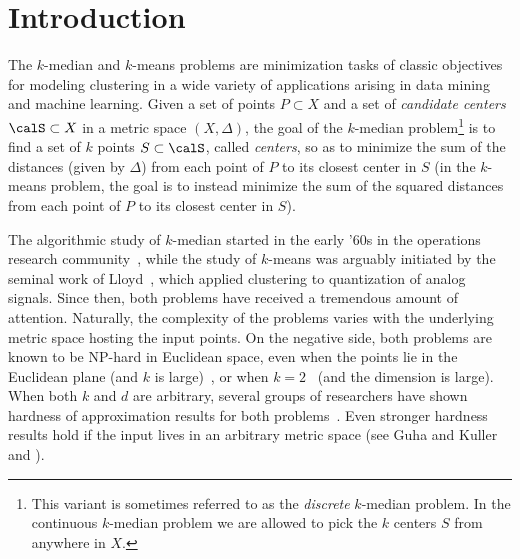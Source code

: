 \section{Introduction}
The $k$-median and $k$-means problems are minimization tasks of classic objectives for modeling
clustering in a wide variety of applications arising in data mining and
machine learning. Given a set of points $P\subset X$  and a set of \emph{candidate centers} $\calS \subset X$ in a metric space $(X, \Delta)$,
the goal of the $k$-median problem\footnote{This variant is sometimes referred to as the \emph{discrete} $k$-median problem. In the continuous $k$-median problem we are allowed to pick the $k$ centers $S$ from anywhere in $X$. } is to find a set of $k$ points $S \subset \calS$, called \emph{centers}, so as
to minimize the sum of the distances (given by $\Delta$) from each point of $P$ to its closest
center in $S$ (in the $k$-means problem, the goal is to instead minimize the sum of the squared distances from each point of $P$ to its closest center in $S$).

The algorithmic study of $k$-median started in the early '60s in the operations research community~\cite{kuehn1963heuristic,stollsteimer1961effect,hakimi1965optimum}, while the study of $k$-means was arguably
 initiated by the seminal work of Lloyd~\cite{lloyd1982least}, which applied clustering to quantization of analog signals. 
Since then, both problems have received a tremendous amount of attention.
Naturally, the complexity of the problems varies
with the underlying metric space hosting the input points. 
On the negative side, both problems are
known to be NP-hard in Euclidean space, even when the points lie in the Euclidean plane (and $k$ is large)~\cite{megiddo1984complexity, MahajanNV12}, or when $k=2$~\cite{dasgupta2009random,AKP24} (and the dimension is large).
When both $k$ and $d$ are arbitrary, 
several groups of researchers have shown hardness
of approximation results for both problems~\cite{AwasthiCKS15,LeeSW17,Cohen-AddadS19,Cohen-AddadSL22}. 
Even stronger hardness
results hold if the input lives in an arbitrary metric space (see Guha and Kuller~\cite{GuK99} and \cite{Cohen-AddadSL21}).

 


